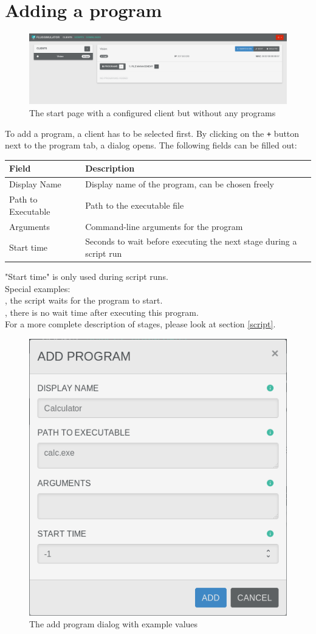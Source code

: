 \documentclass[accentcolor=tud1a, paper=a4, colorback]{tudreport}
\begin{document}
	\section{Adding a program}
	\begin{figure}[h]
		\centering
		\includegraphics[width=.9\textwidth]{startpage_without_programs}
		\caption{The start page with a configured client but without any programs}
		\label{startpage_without_programs}
	\end{figure}
	To add a program, a client has to be selected first. By clicking on the \texttt{+}
	button next to the program tab, a dialog opens. The following fields can be filled
	out:
	\begin{center}
	\begin{tabular}{l|l}
		Field & Description \\\hline
		Display Name &  Display name of the program, can be chosen freely\\
		Path to Executable & Path to the executable file\\
		Arguments & Command-line arguments for the program\\
		Start time & Seconds to wait before executing the next stage during a script run\\
	\end{tabular}
	\end{center}
	"Start time" is only used during script runs.\\
	Special examples:\\
	, the script waits for the program to start.\\
	, there is no wait time after executing this program.\\
	For a more complete description of stages, please look at section \ref{script}.

	\begin{figure}[h]
		\centering
		\includegraphics[width=.3\textwidth]{add_program}
		\caption{The add program dialog with example values}
		\label{add_program}
	\end{figure}
\end{document}
